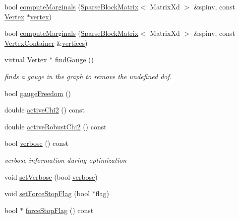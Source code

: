 \begin{DoxyCompactItemize}
\item 
bool \hyperlink{classg2o_1_1SparseOptimizer_ad9f7ba03f7f37114f757f34f67dd48e5}{compute\+Marginals} (\hyperlink{classg2o_1_1SparseBlockMatrix}{Sparse\+Block\+Matrix}$<$ Matrix\+Xd $>$ \&spinv, const \hyperlink{classg2o_1_1HyperGraph_1_1Vertex}{Vertex} $\ast$\hyperlink{structg2o_1_1OptimizableGraph_a19e014e8ec2e9a6e894da8c3a8f8e50d}{vertex})
\item 
bool \hyperlink{classg2o_1_1SparseOptimizer_a06bd3e9f1576dafeae317d2697c6f532}{compute\+Marginals} (\hyperlink{classg2o_1_1SparseBlockMatrix}{Sparse\+Block\+Matrix}$<$ Matrix\+Xd $>$ \&spinv, const \hyperlink{structg2o_1_1OptimizableGraph_a54f01b9b6071e65e6abeebe4afb29dec}{Vertex\+Container} \&\hyperlink{classg2o_1_1HyperGraph_a3e713e7ee84eecad3876651737af6cfc}{vertices})
\item 
virtual \hyperlink{classg2o_1_1HyperGraph_1_1Vertex}{Vertex} $\ast$ \hyperlink{classg2o_1_1SparseOptimizer_aad77b73bf7d192fcebf1daf9ae103036}{find\+Gauge} ()
\begin{DoxyCompactList}\small\item\em finds a gauge in the graph to remove the undefined dof. \end{DoxyCompactList}\item 
bool \hyperlink{classg2o_1_1SparseOptimizer_ac99e785f4822dd540b389ea179ce4f06}{gauge\+Freedom} ()
\item 
double \hyperlink{classg2o_1_1SparseOptimizer_add4d83073e22dbb48b66b953d0185ffa}{active\+Chi2} () const 
\item 
double \hyperlink{classg2o_1_1SparseOptimizer_ae47c5023e53685523499fc00d6057d14}{active\+Robust\+Chi2} () const 
\item 
bool \hyperlink{classg2o_1_1SparseOptimizer_a99851ba4f2a507e724de43d7fe92f903}{verbose} () const 
\begin{DoxyCompactList}\small\item\em verbose information during optimization \end{DoxyCompactList}\item 
void \hyperlink{classg2o_1_1SparseOptimizer_a422f4c5c78a0c475f4998e24ee173cc7}{set\+Verbose} (bool \hyperlink{classg2o_1_1SparseOptimizer_a99851ba4f2a507e724de43d7fe92f903}{verbose})
\item 
void \hyperlink{classg2o_1_1SparseOptimizer_a32afd0ab949f170297b4a59f0d9eab81}{set\+Force\+Stop\+Flag} (bool $\ast$flag)
\item 
bool $\ast$ \hyperlink{classg2o_1_1SparseOptimizer_a13b3b195dd3169303c2c8e0f6edb1bb7}{force\+Stop\+Flag} () const 

\end{DoxyCompactItemize}
